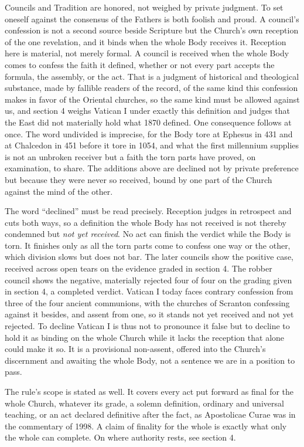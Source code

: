 \documentclass[11pt,twoside]{article}
\newcommand{\unit}[1]{\needspace{3\baselineskip}\par\medskip{\normalfont\bfseries\color{subhead}#1}\par\nobreak\smallskip}
\begin{document}
\unit{The criterion.}
Councils and Tradition are honored, not weighed by private judgment. To set oneself against the consensus of the Fathers is both foolish and proud. A council's confession is not a second source beside Scripture but the Church's own reception of the one revelation, and it binds when the whole Body receives it. Reception here is material, not merely formal. A council is received when the whole Body comes to confess the faith it defined, whether or not every part accepts the formula, the assembly, or the act. That is a judgment of historical and theological substance, made by fallible readers of the record, of the same kind this confession makes in favor of the Oriental churches, so the same kind must be allowed against us, and section 4 weighs Vatican I under exactly this definition and judges that the East did not materially hold what 1870 defined. One consequence follows at once. The word undivided is imprecise, for the Body tore at Ephesus in 431 and at Chalcedon in 451 before it tore in 1054, and what the first millennium supplies is not an unbroken receiver but a faith the torn parts have proved, on examination, to share. The additions above are declined not by private preference but because they were never so received, bound by one part of the Church against the mind of the other.

The word ``declined'' must be read precisely. Reception judges in retrospect and cuts both ways, so a definition the whole Body has not received is not thereby condemned but \emph{not yet received}. No act can finish the verdict while the Body is torn. It finishes only as all the torn parts come to confess one way or the other, which division slows but does not bar. The later councils show the positive case, received across open tears on the evidence graded in section 4. The robber council shows the negative, materially rejected four of four on the grading given in section 4, a completed verdict. Vatican I today faces contrary confession from three of the four ancient communions, with the churches of Scranton confessing against it besides, and assent from one, so it stands not yet received and not yet rejected. To decline Vatican I is thus not to pronounce it false but to decline to hold it as binding on the whole Church while it lacks the reception that alone could make it so. It is a provisional non-assent, offered into the Church's discernment and awaiting the whole Body, not a sentence we are in a position to pass.

The rule's scope is stated as well. It covers every act put forward as final for the whole Church, whatever its grade, a solemn definition, ordinary and universal teaching, or an act declared definitive after the fact, as Apostolicae Curae was in the commentary of 1998. A claim of finality for the whole is exactly what only the whole can complete. On where authority rests, see section 4.
\end{document}
